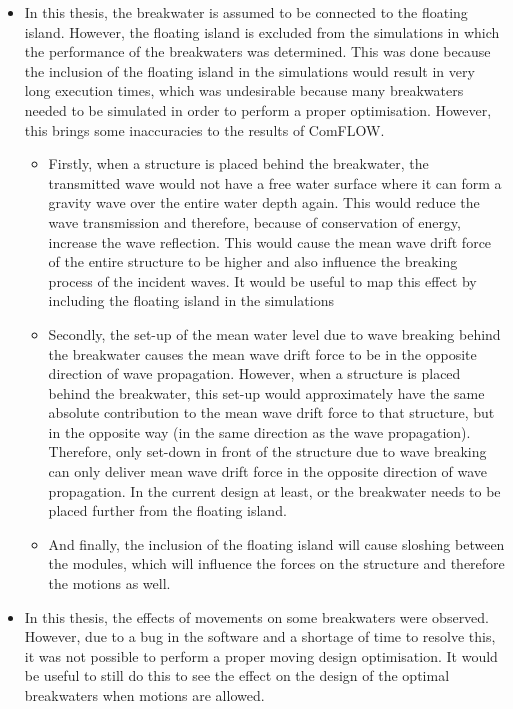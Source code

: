 \begin{itemize}

    \item In this thesis, the breakwater is assumed to be connected to the floating island. However, the floating island is excluded from the simulations in which the performance of the breakwaters was determined. This was done because the inclusion of the floating island in the simulations would result in very long execution times, which was undesirable because many breakwaters needed to be simulated in order to perform a proper optimisation. However, this brings some inaccuracies to the results of ComFLOW. 
    \begin{itemize}
        \item Firstly, when a structure is placed behind the breakwater, the transmitted wave would not have a free water surface where it can form a gravity wave over the entire water depth again. This would reduce the wave transmission and therefore, because of conservation of energy, increase the wave reflection. This would cause the mean wave drift force of the entire structure to be higher and also influence the breaking process of the incident waves. It would be useful to map this effect by including the floating island in the simulations 
        \item Secondly, the set-up of the mean water level due to wave breaking behind the breakwater causes the mean wave drift force to be in the opposite direction of wave propagation. However, when a structure is placed behind the breakwater, this set-up would approximately have the same absolute contribution to the mean wave drift force to that structure, but in the opposite way (in the same direction as the wave propagation). Therefore, only set-down in front of the structure due to wave breaking can only deliver mean wave drift force in the opposite direction of wave propagation. In the current design at least, or the breakwater needs to be placed further from the floating island. 
        \item And finally, the inclusion of the floating island will cause sloshing between the modules, which will influence the forces on the structure and therefore the motions as well. 
    \end{itemize}

    \item In this thesis, the effects of movements on some breakwaters were observed. However, due to a bug in the software and a shortage of time to resolve this, it was not possible to perform a proper moving design optimisation. It would be useful to still do this to see the effect on the design of the optimal breakwaters when motions are allowed. 


\end{itemize}
